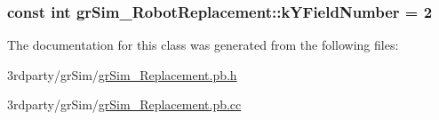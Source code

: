 \hypertarget{classgr_sim___robot_replacement_af925d6a8427605ebe46720d2bda5880c}{
\subsubsection[{k\-Y\-Field\-Number}]{\setlength{\rightskip}{0pt plus 5cm}const int gr\-Sim\-\_\-\-Robot\-Replacement\-::k\-Y\-Field\-Number = 2\hspace{0.3cm}{\ttfamily [static]}}}\label{classgr_sim___robot_replacement_af925d6a8427605ebe46720d2bda5880c}


The documentation for this class was generated from the following files\-:\begin{DoxyCompactItemize}
\item 
3rdparty/gr\-Sim/\hyperlink{gr_sim___replacement_8pb_8h}{gr\-Sim\-\_\-\-Replacement.\-pb.\-h}\item 
3rdparty/gr\-Sim/\hyperlink{gr_sim___replacement_8pb_8cc}{gr\-Sim\-\_\-\-Replacement.\-pb.\-cc}\end{DoxyCompactItemize}
